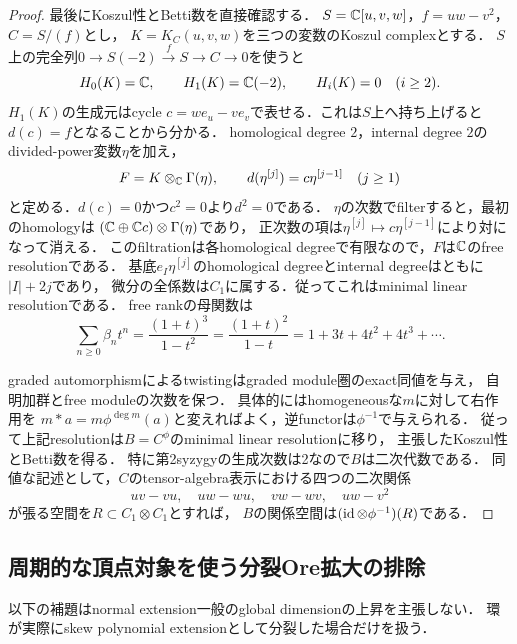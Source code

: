 \documentclass[11pt,a4paper]{ltjsarticle}
\begin{document}
\begin{proof}
最後にKoszul性とBetti数を直接確認する．
$S=\mathbb C[u,v,w]$，$f=uw-v^2$，$C=S/(f)$とし，
$K=K_C(u,v,w)$を三つの変数のKoszul complexとする．
$S$上の完全列$0\to S(-2)\xrightarrow{f}S\to C\to0$を使うと
\[
 H_0(K)=\mathbb C,\qquad H_1(K)=\mathbb C(-2),\qquad H_i(K)=0\quad(i\geq2).
\]
$H_1(K)$の生成元はcycle
$c=w e_u-v e_v$で表せる．これは$S$上へ持ち上げると$d(c)=f$となることから分かる．
homological degree $2$，internal degree $2$のdivided-power変数$\eta$を加え，
\[
 F=K\otimes_\mathbb C\Gamma(\eta),\qquad
 d(\eta^{[j]})=c\eta^{[j-1]}\quad(j\geq1)
\]
と定める．$d(c)=0$かつ$c^2=0$より$d^2=0$である．
$\eta$の次数でfilterすると，最初のhomologyは
$(\mathbb C\oplus\mathbb C c)\otimes\Gamma(\eta)$であり，
正次数の項は$\eta^{[j]}\mapsto c\eta^{[j-1]}$により対になって消える．
このfiltrationは各homological degreeで有限なので，$F$は$\mathbb C$のfree resolutionである．
基底$e_I\eta^{[j]}$のhomological degreeとinternal degreeはともに$|I|+2j$であり，
微分の全係数は$C_1$に属する．従ってこれはminimal linear resolutionである．
free rankの母関数は
\[
 \sum_{n\geq0}\beta_n t^n
 =\frac{(1+t)^3}{1-t^2}
 =\frac{(1+t)^2}{1-t}
 =1+3t+4t^2+4t^3+\cdots.
\]

graded automorphismによるtwistingはgraded module圏のexact同値を与え，
自明加群とfree moduleの次数を保つ．
具体的にはhomogeneousな$m$に対して右作用を
$m*a=m\phi^{\deg m}(a)$と変えればよく，逆functorは$\phi^{-1}$で与えられる．
従って上記resolutionは$B=C^\phi$のminimal linear resolutionに移り，
主張したKoszul性とBetti数を得る．
特に第2syzygyの生成次数は2なので$B$は二次代数である．
同値な記述として，$C$のtensor-algebra表示における四つの二次関係
\[
 uv-vu,\quad uw-wu,\quad vw-wv,\quad uw-v^2
\]
が張る空間を$R\subset C_1\otimes C_1$とすれば，
$B$の関係空間は$(\operatorname{id}\otimes\phi^{-1})(R)$である．
\end{proof}


\subsection{周期的な頂点対象を使う分裂Ore拡大の排除}

以下の補題はnormal extension一般のglobal dimensionの上昇を主張しない．
環が実際にskew polynomial extensionとして分裂した場合だけを扱う．
\end{document}
